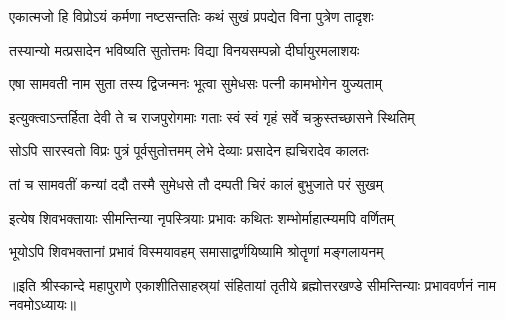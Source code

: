 \twolineshloka
{एकात्मजो हि विप्रोऽयं कर्मणा नष्टसन्ततिः}
{कथं सुखं प्रपद्येत विना पुत्रेण तादृशः} %

\twolineshloka
{तस्यान्यो मत्प्रसादेन भविष्यति सुतोत्तमः}
{विद्या विनयसम्पन्नो दीर्घायुरमलाशयः} %

\twolineshloka
{एषा सामवती नाम सुता तस्य द्विजन्मनः}
{भूत्वा सुमेधसः पत्नी कामभोगेन युज्यताम्} %

\twolineshloka
{इत्युक्त्वाऽन्तर्हिता देवी ते च राजपुरोगमाः}
{गताः स्वं स्वं गृहं सर्वे चक्रुस्तच्छासने स्थितिम्} %

\twolineshloka
{सोऽपि सारस्वतो विप्रः पुत्रं पूर्वसुतोत्तमम्}
{लेभे देव्याः प्रसादेन ह्यचिरादेव कालतः} %

\twolineshloka
{तां च सामवतीं कन्यां ददौ तस्मै सुमेधसे}
{तौ दम्पती चिरं कालं बुभुजाते परं सुखम्} %

\twolineshloka
{इत्येष शिवभक्तायाः सीमन्तिन्या नृपस्त्रियाः}
{प्रभावः कथितः शम्भोर्माहात्म्यमपि वर्णितम्} %

\twolineshloka
{भूयोऽपि शिवभक्तानां प्रभावं विस्मयावहम्}
{समासाद्वर्णयिष्यामि श्रोतॄणां मङ्गलायनम्} %

{॥इति श्रीस्कान्दे महापुराणे एकाशीतिसाहस्र्यां संहितायां तृतीये ब्रह्मोत्तरखण्डे सीमन्तिन्याः प्रभाववर्णनं नाम नवमोऽध्यायः॥} 

